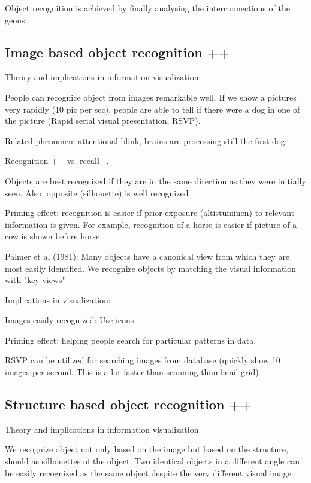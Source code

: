 \documentclass[a4paper]{article}
\begin{document}
Object recognition is achieved by finally analysing the interconnections of the geons.

\subsection{Image based object recognition ++}

Theory and implications in information visualization

People can recognice object from images remarkable well. If we show a pictures very rapidly (10 pic per sec), people are able to tell if there were a dog in one of the picture (Rapid serial visual presentation, RSVP).

Related phenomen: attentional blink, brains are processing still the first dog

Recognition ++ vs. recall --.

Objects are best recognized if they are in the same direction as they were initially seen. Also, opposite (silhouette) is well recognized

Priming effect: recognition is easier if prior exposure (altistuminen) to relevant information is given. For example, recognition of a horse is easier if picture of a cow is shown before horse.

Palmer et al (1981): Many objects have a canonical view from which they are most easily identified. We recognize objects by matching the visual information with "key views"

Implications in visualization:

Images easily recognized: Use icons

Priming effect: helping people search for particular patterns in data.

RSVP can be utilized for searching images from database (quickly show 10 images per second. This is a lot faster than scanning thumbnail grid)

\subsection{Structure based object recognition ++}

Theory and implications in information visualization

We recognize object not only based on the image but based on the structure, should as silhouettes of the object. Two identical objects in a different angle can be easily recognized as the same object despite the very different visual image.
\end{document}
